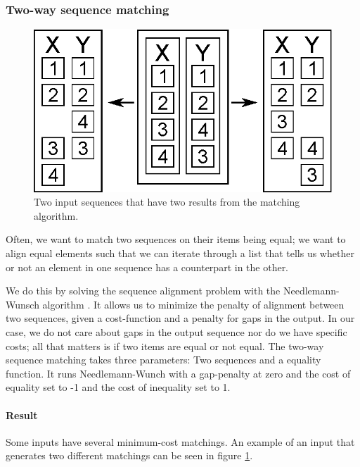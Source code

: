 \documentclass[11pt]{article}
\begin{document}
\subsubsection{Two-way sequence matching}
\begin{figure}
   \centerline{\includegraphics[scale=0.4]{drawings/eps/mincostsequencematchingambigious.eps}}
   \caption{Two input sequences that have two results from the matching algorithm.}
   \label{TwoWayMatchingAmbigiouty}
\end{figure}

Often, we want to match two sequences on their items being equal; we want to align equal elements such that we can iterate through a list that tells us whether or not an element in one sequence has a counterpart in the other.

We do this by solving the sequence alignment problem with the Needlemann-Wunsch algorithm \cite{Needleman1970443}. It allows us to minimize the penalty of alignment between two sequences, given a cost-function and a penalty for gaps in the output. In our case, we do not care about gaps in the output sequence nor do we have specific costs; all that matters is if two items are equal or not equal. The two-way sequence matching takes three parameters: Two sequences and a equality function. It runs Needlemann-Wunch with a gap-penalty at zero and the cost of equality set to -1 and the cost of inequality set to 1.

\paragraph{Result} Some inputs have several minimum-cost matchings. An example of an input that generates two different matchings can be seen in figure \ref{TwoWayMatchingAmbigiouty}.
\end{document}
